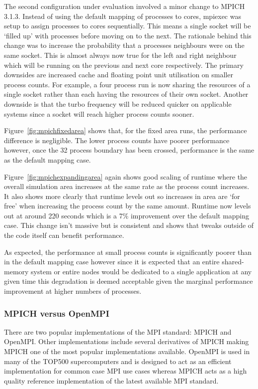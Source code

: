 The second configuration under evaluation involved a minor change to MPICH
3.1.3. Instead of using the default mapping of processes to cores, mpiexec was
setup to assign processes to cores sequentially. This means a single socket will
be `filled up' with processes before moving on to the next. The rationale behind
this change was to increase the probability that a processes neighbours were on
the same socket. This is almost always now true for the left and right neighbour
which will be running on the previous and next core respectively. The primary
downsides are increased cache and floating point unit utilisation on smaller
process counts. For example, a four process run is now sharing the resources of
a single socket rather than each having the resources of their own socket.
Another downside is that the turbo frequency will be reduced quicker on
applicable systems since a socket will reach higher process counts sooner.

Figure~\ref{fig:mpichfixedarea} shows that, for the fixed area runs, the
performance difference is negligible. The lower process counts have poorer
performance however, once the 32 process boundary has been crossed, performance
is the same as the default mapping case.

Figure~\ref{fig:mpichexpandingarea} again shows good scaling of
runtime where the overall simulation area increases at the same rate as the
process count increases. It also shows more clearly that runtime levels out so
increases in area are `for free' when increasing the process count by the same
amount. Runtime now levels out at around 220 seconds which is a 7\% improvement
over the default mapping case. This change isn't massive but is consistent and
shows that tweaks outside of the code itself can benefit performance.

As expected, the performance at small process counts is significantly poorer
than in the default mapping case however since it is expected that an entire
shared-memory system or entire nodes would be dedicated to a single application
at any given time this degradation is deemed acceptable given the marginal
performance improvement at higher numbers of processes.

\subsubsection{MPICH versus OpenMPI}

There are two popular implementations of the MPI standard: MPICH and OpenMPI.
Other implementations include several derivatives of MPICH making MPICH one of
the most popular implementations available. OpenMPI is used in many of the
TOP500 supercomputers and is designed to act as an efficient implementation for
common case MPI use cases whereas MPICH acts as a high quality reference
implementation of the latest available MPI standard.

